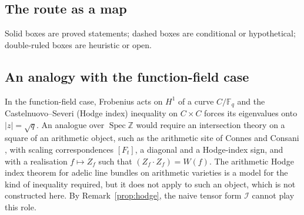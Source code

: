 \documentclass[11pt]{amsart}
\theoremstyle{definition}
\theoremstyle{remark}
\newcommand{\RH}{\mathrm{RH}}
\newcommand{\om}{\omega}
\newcommand{\eps}{\varepsilon}
\newcommand{\Spec}{\operatorname{Spec}}
\newcommand{\Fq}{\mathbb{F}_q}
\newcommand{\Z}{\mathbb{Z}}
\newcommand{\Th}{\Theta}
\newcommand{\indm}{\operatorname{ind}_-}
\begin{document}
\subsection{The route as a map}
\begin{center}
\end{center}
\noindent Solid boxes are proved statements; dashed boxes are conditional or hypothetical;
double-ruled boxes are heuristic or open.

\subsection{An analogy with the function-field case}
In the function-field case, Frobenius acts on $H^1$ of a curve $C/\Fq$ and the Castelnuovo--Severi
(Hodge index) inequality on $C\times C$ forces its eigenvalues onto $|z|=\sqrt q$. An analogue over
$\Spec\Z$ would require an intersection theory on a square of an arithmetic object, such as the
arithmetic site of Connes and Consani \cite{CC}, with scaling correspondences $[F_t]$, a diagonal
and a Hodge-index sign, and with a realisation $f\mapsto Z_f$ such that $(Z_f\cdot Z_f)=W(f)$.
The arithmetic Hodge index theorem for adelic line bundles on arithmetic varieties
\cite{YuanZhang} is a model for the kind of inequality required, but it does not apply to such an
object, which is not constructed here. By Remark~\ref{prop:hodge}, the naive tensor form
$\mathcal I$ cannot play this role.
\end{document}
